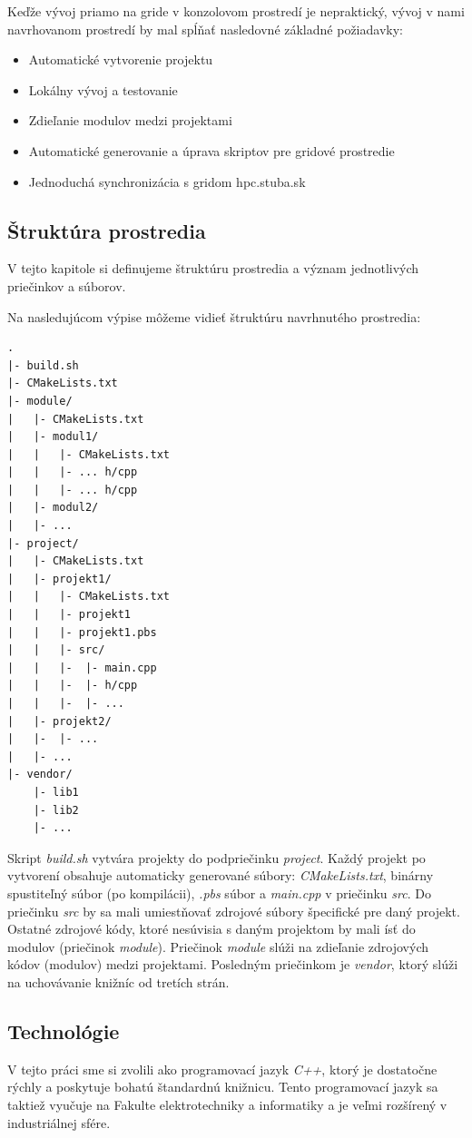 Keďže vývoj priamo na gride v konzolovom prostredí je nepraktický, vývoj v nami navrhovanom prostredí by mal spĺňať nasledovné
základné požiadavky:
\begin{itemize}
\item
  Automatické vytvorenie projektu
\item
  Lokálny vývoj a testovanie
\item
  Zdieľanie modulov medzi projektami
\item
  Automatické generovanie a úprava skriptov pre gridové prostredie
\item
  Jednoduchá synchronizácia s gridom hpc.stuba.sk
\end{itemize}

\subsection{Štruktúra prostredia}
V tejto kapitole si definujeme štruktúru prostredia a význam jednotlivých priečinkov a súborov.

Na nasledujúcom výpise môžeme vidieť štruktúru navrhnutého prostredia:
\begin{lstlisting}[caption={Štruktúra prostredia}, label={prop:struktura}]
.
|- build.sh
|- CMakeLists.txt
|- module/
|   |- CMakeLists.txt
|   |- modul1/
|   |   |- CMakeLists.txt
|   |   |- ... h/cpp
|   |   |- ... h/cpp
|   |- modul2/
|   |- ...
|- project/
|   |- CMakeLists.txt
|   |- projekt1/
|   |   |- CMakeLists.txt
|   |   |- projekt1
|   |   |- projekt1.pbs
|   |   |- src/
|   |   |-  |- main.cpp
|   |   |-  |- h/cpp
|   |   |-  |- ...
|   |- projekt2/
|   |-  |- ...
|   |- ...
|- vendor/
    |- lib1
    |- lib2
    |- ...
\end{lstlisting}

Skript \textit{build.sh} vytvára projekty do podpriečinku \textit{project}. Každý projekt po vytvorení obsahuje automaticky generované súbory:
\textit{CMakeLists.txt}, binárny spustiteľný súbor (po kompilácii), \textit{.pbs} súbor a \textit{main.cpp} v priečinku \textit{src}.
Do priečinku \textit{src} by sa mali umiestňovať zdrojové súbory špecifické pre daný projekt.
Ostatné zdrojové kódy, ktoré nesúvisia s daným projektom by mali ísť do modulov (priečinok \textit{module}).
Priečinok \textit{module} slúži na zdieľanie zdrojových kódov (modulov) medzi projektami.
Posledným priečinkom je \textit{vendor}, ktorý slúži na uchovávanie knižníc od tretích strán.
\subsection{Technológie}
V tejto práci sme si zvolili ako programovací jazyk \textit{C++}, ktorý je dostatočne rýchly a poskytuje bohatú štandardnú knižnicu.
Tento programovací jazyk sa taktiež vyučuje na Fakulte elektrotechniky a informatiky a je veľmi rozšírený v industriálnej sfére.

